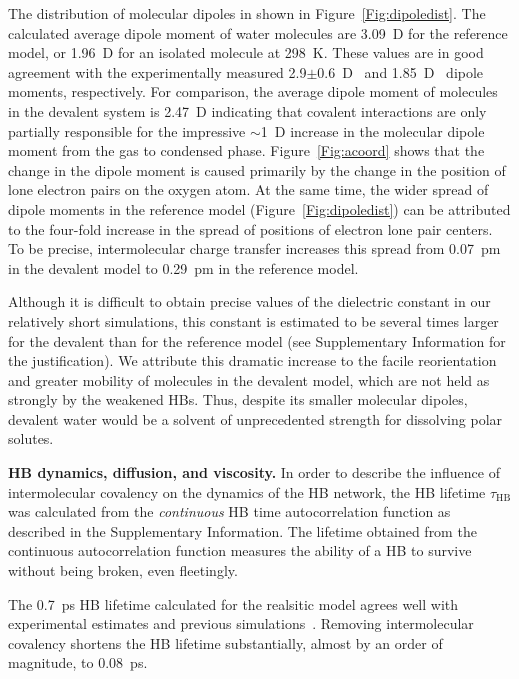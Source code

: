 \documentclass[10pt,amsmath,twocolumn,aps,prl,superscriptaddress,floatfix]{revtex4-1}
\begin{document}
The distribution of molecular dipoles in shown in Figure~\ref{Fig:dipoledist}.  
The calculated average dipole moment of water molecules are 3.09~D for the reference model, or 1.96~D for an isolated molecule at 298~K.
These values are in good agreement with the experimentally measured 2.9$\pm$0.6~D~\cite{badyal2000electron} and 1.85~D~\cite{haynes2014crc} dipole moments, respectively. 
For comparison, the average dipole moment of molecules in the devalent system is 2.47~D indicating that covalent interactions are only partially responsible for the impressive $\sim$1~D increase in the molecular dipole moment from the gas to condensed phase. 
Figure~\ref{Fig:acoord} shows that the change in the dipole moment is caused primarily by the change in the position of lone electron pairs on the oxygen atom. 
At the same time, the wider spread of dipole moments in the reference model (Figure~\ref{Fig:dipoledist}) can be attributed to the four-fold increase in the spread of positions of electron lone pair centers. 
To be precise, intermolecular charge transfer increases this spread from 0.07~pm in the devalent model to 0.29~pm in the reference model.
%

Although it is difficult to obtain precise values of the dielectric constant in our relatively short simulations, this constant is estimated to be several times larger for the devalent than for the reference model (see Supplementary Information for the justification). 
We attribute this dramatic increase to the facile reorientation and greater mobility of molecules in the devalent model, which are not held as strongly by the weakened HBs. 
Thus, despite its smaller molecular dipoles, devalent water would be a solvent of unprecedented strength for dissolving polar solutes.

\textbf{HB dynamics, diffusion, and viscosity.} In order to describe the influence of intermolecular covalency on the dynamics of the HB network, the HB lifetime $\tau_{\text{HB}}$ was calculated from the \emph{continuous} HB time autocorrelation function as described in the Supplementary Information. The lifetime obtained from the continuous autocorrelation function measures the ability of a HB to survive without being broken, even fleetingly.

The 0.7~ps HB lifetime calculated for the realsitic model agrees well with experimental estimates \cite{lawrence2003ultrafast} and previous simulations~\cite{marti1996molecular,starr1999fast}. Removing intermolecular covalency shortens the HB lifetime substantially, almost by an order of magnitude, to 0.08~ps. 
\end{document}

